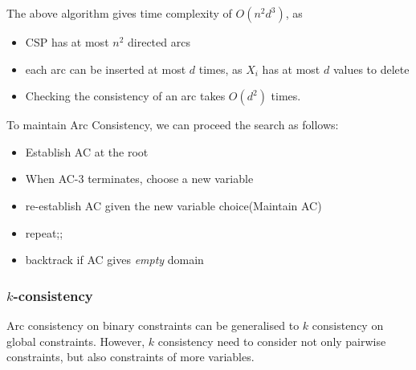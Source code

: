 \documentclass[12pt]{article}
\theoremstyle{definition}
\begin{document}
The above algorithm gives time complexity of $O(n^2d^3)$, as
\begin{itemize}
	\item CSP has at most $n^2$ directed arcs
	\item each arc can be inserted at most $d$ times, as $X_i$ has at most $d$ values to delete
	\item Checking the consistency of an arc takes $O(d^2)$ times.
\end{itemize}
To maintain Arc Consistency, we can proceed the search as follows:
\begin{itemize}
	\item Establish AC at the root
	\item When AC-3 terminates, choose a new variable
	\item re-establish AC given the new variable choice(Maintain AC)
	\item repeat;;
	\item backtrack if AC gives \textit{empty} domain
\end{itemize}
\subsubsection{{$k$-consistency}}
Arc consistency on binary constraints can be generalised to $k$ consistency on global constraints. However, $k$ consistency need to consider not only pairwise constraints, but also constraints of more variables.
\end{document}
